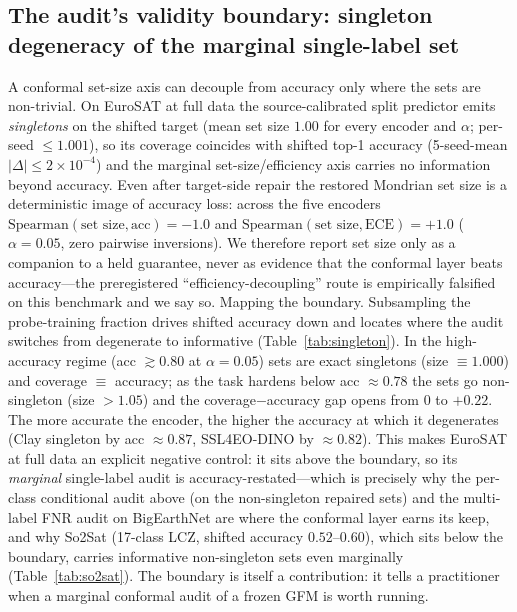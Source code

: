 \documentclass[journal]{IEEEtran}
\renewcommand{\_}{\textunderscore\allowbreak}
\begin{document}
\subsection{The audit's validity boundary: singleton degeneracy of the marginal single-label set}
A conformal set-size axis can decouple from accuracy only where the sets are non-trivial. On EuroSAT at
full data the source-calibrated split predictor emits \emph{singletons} on the shifted target (mean set
size $1.00$ for every encoder and $\alpha$; per-seed $\le1.001$), so its coverage coincides with shifted
top-1 accuracy (5-seed-mean $|\Delta|\le2\times10^{-4}$) and the marginal set-size/efficiency axis carries
no information beyond accuracy. Even after target-side repair the restored Mondrian set size is a
deterministic image of accuracy loss: across the five encoders $\mathrm{Spearman}(\text{set size},\text{acc})=-1.0$
and $\mathrm{Spearman}(\text{set size},\text{ECE})=+1.0$ ($\alpha{=}0.05$, zero pairwise inversions). We
therefore report set size only as a companion to a held guarantee, never as evidence that the conformal
layer beats accuracy---the preregistered ``efficiency-decoupling'' route is empirically falsified on this
benchmark and we say so.
Mapping the boundary. Subsampling the probe-training fraction drives shifted accuracy down and
locates where the audit switches from degenerate to informative (Table~\ref{tab:singleton}). In the
high-accuracy regime (acc $\gtrsim0.80$ at $\alpha{=}0.05$) sets are exact singletons (size $\equiv1.000$)
and coverage $\equiv$ accuracy; as the task hardens below acc $\approx0.78$ the sets go non-singleton
(size $>1.05$) and the coverage$-$accuracy gap opens from $0$ to $+0.22$. The more accurate the encoder,
the higher the accuracy at which it degenerates (Clay singleton by acc $\approx0.87$, SSL4EO-DINO by
$\approx0.82$). This makes EuroSAT at full data an explicit negative control: it sits above
the boundary, so its \emph{marginal} single-label audit is accuracy-restated---which is precisely why the
per-class conditional audit above (on the non-singleton repaired sets) and the multi-label FNR audit
on BigEarthNet are where the conformal layer earns its keep, and why So2Sat (17-class LCZ, shifted accuracy
$0.52$--$0.60$), which sits below the boundary, carries informative non-singleton sets even
marginally (Table~\ref{tab:so2sat}). The boundary is itself a contribution: it tells a practitioner when a
marginal conformal audit of a frozen GFM is worth running.
\end{document}
